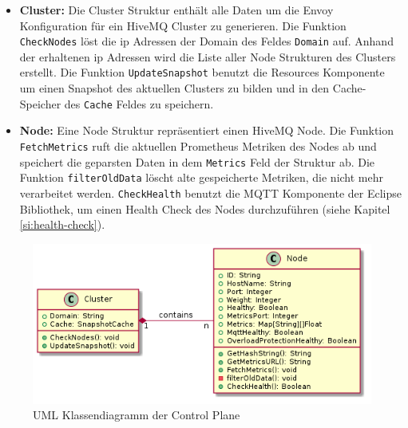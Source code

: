 \begin{itemize}
  \item \textbf{Cluster:} Die Cluster Struktur enthält alle Daten um die Envoy Konfiguration für ein HiveMQ Cluster zu generieren. Die Funktion \verb|CheckNodes| löst die \ac{ip} Adressen der Domain des Feldes \verb|Domain| auf. Anhand der erhaltenen \ac{ip} Adressen wird die Liste aller Node Strukturen des Clusters erstellt. Die Funktion \verb|UpdateSnapshot| benutzt die Resources Komponente um einen Snapshot des aktuellen Clusters zu bilden und in den Cache-Speicher des \verb|Cache| Feldes zu speichern.
  \item \textbf{Node:} Eine Node Struktur repräsentiert einen HiveMQ Node. Die Funktion \verb|FetchMetrics| ruft die aktuellen Prometheus Metriken des Nodes ab und speichert die geparsten Daten in dem \verb|Metrics| Feld der Struktur ab. Die Funktion \verb|filterOldData| löscht alte gespeicherte Metriken, die nicht mehr verarbeitet werden. \verb|CheckHealth| benutzt die MQTT Komponente der Eclipse Bibliothek, um einen Health Check des Nodes durchzuführen (siehe Kapitel \ref{si:health-check}).
\end{itemize}

\begin{figure}
    \centering
    \includegraphics[scale=0.6]{gen/class.png}
    \caption{UML Klassendiagramm der Control Plane}
    \label{fig:class-diagram}
\end{figure}

